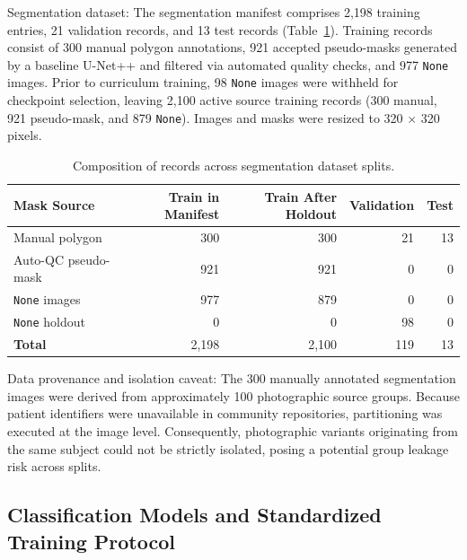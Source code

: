 \documentclass[11pt,a4paper]{article}
\begin{document}
Segmentation dataset: The segmentation manifest comprises 2,198 training entries, 21 validation records, and 13 test records (Table~\ref{tab:table3}). Training records consist of 300 manual polygon annotations, 921 accepted pseudo-masks generated by a baseline U-Net++ and filtered via automated quality checks, and 977 \texttt{None} images. Prior to curriculum training, 98 \texttt{None} images were withheld for checkpoint selection, leaving 2,100 active source training records (300 manual, 921 pseudo-mask, and 879 \texttt{None}). Images and masks were resized to 320 $\times$ 320 pixels.

\begin{table}[htbp]
\centering
\caption{Composition of records across segmentation dataset splits.}
\label{tab:table3}
\small
\begin{tabular}{lrrrr}
\toprule
\textbf{Mask Source} & \textbf{Train in Manifest} & \textbf{Train After Holdout} & \textbf{Validation} & \textbf{Test} \\
\midrule
Manual polygon       & 300   & 300   & 21  & 13 \\
Auto-QC pseudo-mask  & 921   & 921   & 0   & 0  \\
\texttt{None} images & 977   & 879   & 0   & 0  \\
\texttt{None} holdout& 0     & 0     & 98  & 0  \\
\midrule
\textbf{Total}       & 2,198 & 2,100 & 119 & 13 \\
\bottomrule
\end{tabular}
\end{table}

Data provenance and isolation caveat: The 300 manually annotated segmentation images were derived from approximately 100 photographic source groups. Because patient identifiers were unavailable in community repositories, partitioning was executed at the image level. Consequently, photographic variants originating from the same subject could not be strictly isolated, posing a potential group leakage risk across splits.

\subsection{Classification Models and Standardized Training Protocol}
\end{document}
